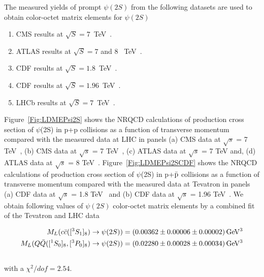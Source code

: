 \documentclass[12pt,a4paper,final]{iopart}
\newcommand{\barQ}{{\bar{Q}}}
\newcommand{\barc}{{\bar{c}}}
\newcommand{\charm}{{\rm{charm}}}
\begin{document}
The measured yields of prompt $\psi(2S)$ from the following datasets
are used to obtain color-octet matrix elements for $\psi(2S)$ 
\begin{enumerate}
\item{CMS results at $\sqrt{S}=7$~TeV~\cite{Chatrchyan:2011kc,Khachatryan:2015rra}}.
\item{ATLAS results at $\sqrt{S}=7$ and 8 ~TeV~\cite{Aad:2015duc}}.
\item{CDF results at $\sqrt{S}=1.8$~TeV~\cite{Abe:1997jz}}.
\item{CDF results at $\sqrt{S}=1.96$~TeV~\cite{Acosta:2004yw}}.
\item{LHCb results at $\sqrt{S}=7$~TeV~\cite{Aaij:2012ag}}.
\end{enumerate}
Figure~\ref{Fig:LDMEPsi2S} shows the NRQCD calculations of production cross section of 
$\psi$(2S) in p+p collisions as a function of transverse momentum compared with the 
measured data at LHC in panels
(a) CMS data at $\sqrt{s}$ = 7 TeV~\cite{Chatrchyan:2011kc},
(b) CMS data at $\sqrt{s}$ = 7 TeV~\cite{Khachatryan:2015rra}, 
(c) ATLAS data at $\sqrt{s}$ = 7 TeV and, 
(d) ATLAS data at $\sqrt{s}$ = 8 TeV~\cite{Aad:2015duc}. 
 Figure~\ref{Fig:LDMEPsi2SCDF} shows the NRQCD calculations of production cross section 
of $\psi$(2S) in p+{$\bar {\rm p}$} collisions as a function of transverse momentum compared 
with the measured data at Tevatron in panels (a) CDF data at $\sqrt{s}$ = 1.8 TeV~\cite{Abe:1997jz} 
and (b) CDF data at $\sqrt{s}$ = 1.96 TeV~\cite{Acosta:2004yw}. 
We obtain following values of $\psi(2S)$ color-octet matrix elements by a combined fit of 
the Tevatron and LHC data   

\begin{equation}
  \begin{split}
    M_{L}(c\barc([^3S_1]_{8})\rightarrow \psi(2S)) &= (0.00362\pm 0.00006 \pm {\color{black} 0.00002}) \, {\rm GeV^3}\\
    M_{L}(Q\barQ([^1S_0]_{8},[^3P_0]_{8})\rightarrow \psi(2S)) &= (0.02280\pm 0.00028 \pm {\color{black}0.00034}) \,{\rm GeV^3}\\
     ~\label{eq:COLDME_Psi}
  \end{split}
\end{equation}
with a {\color{black}$\chi^2/dof=2.54$}. 
\end{document}
